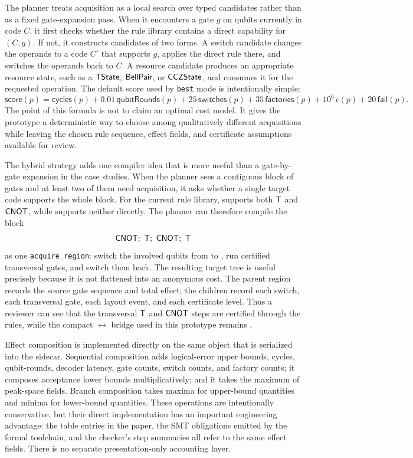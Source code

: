 The planner treats acquisition as a local search over typed candidates rather than as a fixed gate-expansion pass.
When it encounters a gate $g$ on qubits currently in code $C$, it first checks whether the rule library contains a direct capability for $(C,g)$.
If not, it constructs candidates of two forms.
A switch candidate changes the operands to a code $C'$ that supports $g$, applies the direct rule there, and switches the operands back to $C$.
A resource candidate produces an appropriate resource state, such as a $\mathsf{TState}$, $\mathsf{BellPair}$, or $\mathsf{CCZState}$, and consumes it for the requested operation.
The default score used by \texttt{best} mode is intentionally simple:
\[
  \mathsf{score}(p) =
  \mathsf{cycles}(p)
  + 0.01\,\mathsf{qubitRounds}(p)
  + 25\,\mathsf{switches}(p)
  + 35\,\mathsf{factories}(p)
  + 10^6\,\epsilon(p)
  + 20\,\mathsf{fail}(p).
\]
The point of this formula is not to claim an optimal cost model.
It gives the prototype a deterministic way to choose among qualitatively different acquisitions while leaving the chosen rule sequence, effect fields, and certificate assumptions available for review.

The hybrid strategy adds one compiler idea that is more useful than a gate-by-gate expansion in the case studies.
When the planner sees a contiguous block of gates and at least two of them need acquisition, it asks whether a single target code supports the whole block.
For the current rule library,  supports both $\mathsf{T}$ and $\mathsf{CNOT}$, while  supports neither directly.
The planner can therefore compile the block
\[
  \gate{CNOT};\ \gate{T};\ \gate{CNOT};\ \gate{T}
\]
as one \texttt{acquire\_region}: switch the involved qubits from  to , run certified transversal gates, and switch them back.
The resulting target tree is useful precisely because it is not flattened into an anonymous cost.
The parent region records the source gate sequence and total effect; the children record each switch, each transversal gate, each layout event, and each certificate level.
Thus a reviewer can see that the transversal $\mathsf{T}$ and $\mathsf{CNOT}$ steps are certified through the  rules, while the compact $\leftrightarrow$ bridge used in this prototype remains \Assumed{}.

Effect composition is implemented directly on the same object that is serialized into the sidecar.
Sequential composition adds logical-error upper bounds, cycles, qubit-rounds, decoder latency, gate counts, switch counts, and factory counts; it composes acceptance lower bounds multiplicatively; and it takes the maximum of peak-space fields.
Branch composition takes maxima for upper-bound quantities and minima for lower-bound quantities.
These operations are intentionally conservative, but their direct implementation has an important engineering advantage: the table entries in the paper, the SMT obligations emitted by the formal toolchain, and the checker's step summaries all refer to the same effect fields.
There is no separate presentation-only accounting layer.


